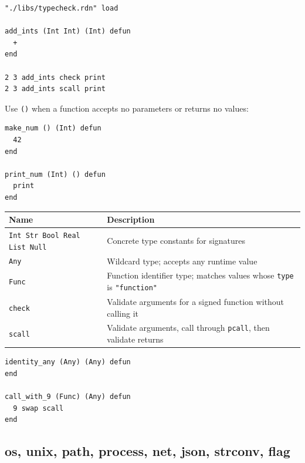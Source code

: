 \documentclass[11pt,a4paper]{article}
\newcommand{\code}[1]{\texttt{#1}}
\begin{document}
\begin{lstlisting}[language=Raden]
"./libs/typecheck.rdn" load

add_ints (Int Int) (Int) defun
  +
end

2 3 add_ints check print
2 3 add_ints scall print
\end{lstlisting}

Use \code{()} when a function accepts no parameters or returns no values:

\begin{lstlisting}[language=Raden]
make_num () (Int) defun
  42
end

print_num (Int) () defun
  print
end
\end{lstlisting}

\begin{longtable}{ll}
\toprule
Name & Description \\
\midrule
\code{Int Str Bool Real List Null} & Concrete type constants for signatures \\
\code{Any} & Wildcard type; accepts any runtime value \\
\code{Func} & Function identifier type; matches values whose \code{type} is \code{"function"} \\
\code{check} & Validate arguments for a signed function without calling it \\
\code{scall} & Validate arguments, call through \code{pcall}, then validate returns \\
\bottomrule
\end{longtable}

\begin{lstlisting}[language=Raden]
identity_any (Any) (Any) defun
end

call_with_9 (Func) (Any) defun
  9 swap scall
end
\end{lstlisting}

\subsection{os, unix, path, process, net, json, strconv, flag}
\end{document}
